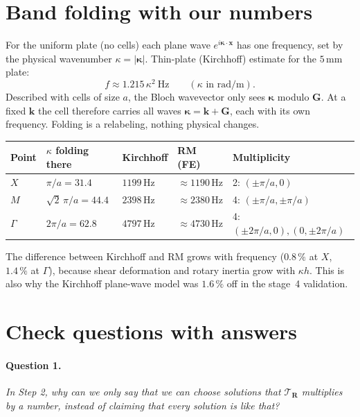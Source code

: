 \section{Band folding with our numbers}

For the uniform plate (no cells) each plane wave $e^{i\boldsymbol{\kappa}\cdot\mathbf{x}}$
has one frequency, set by the physical wavenumber $\kappa = |\boldsymbol{\kappa}|$.
Thin-plate (Kirchhoff) estimate for the $5\,\mathrm{mm}$ plate:
\begin{equation}
  f \approx 1.215\,\kappa^2\ \mathrm{Hz}\qquad(\kappa \text{ in rad/m}).
\end{equation}
Described with cells of size $a$, the Bloch wavevector only sees
$\boldsymbol{\kappa}$ modulo $\mathbf{G}$. At a fixed $\mathbf{k}$ the cell
therefore carries all waves $\boldsymbol{\kappa} = \mathbf{k} + \mathbf{G}$,
each with its own frequency. Folding is a relabeling, nothing physical
changes.

\begin{center}
\begin{tabular}{|l|l|l|l|l|}
\hline
Point & $\kappa$ folding there & Kirchhoff & RM (FE) & Multiplicity \\
\hline
$X$ & $\pi/a = 31.4$ & $1199\,\mathrm{Hz}$ & $\approx 1190\,\mathrm{Hz}$ & 2: $(\pm\pi/a, 0)$ \\
$M$ & $\sqrt{2}\,\pi/a = 44.4$ & $2398\,\mathrm{Hz}$ & $\approx 2380\,\mathrm{Hz}$ & 4: $(\pm\pi/a, \pm\pi/a)$ \\
$\Gamma$ & $2\pi/a = 62.8$ & $4797\,\mathrm{Hz}$ & $\approx 4730\,\mathrm{Hz}$ & 4: $(\pm 2\pi/a, 0), (0, \pm 2\pi/a)$ \\
\hline
\end{tabular}
\end{center}
The difference between Kirchhoff and RM grows with frequency
($0.8\,\%$ at $X$, $1.4\,\%$ at $\Gamma$), because shear deformation and
rotary inertia grow with $\kappa h$. This is also why the Kirchhoff
plane-wave model was $1.6\,\%$ off in the stage~4 validation.

\section{Check questions with answers}

\paragraph{Question 1.} \emph{In Step 2, why can we only say that we can
choose solutions that $\mathcal{T}_{\mathbf{R}}$ multiplies by a number,
instead of claiming that every solution is like that?}

